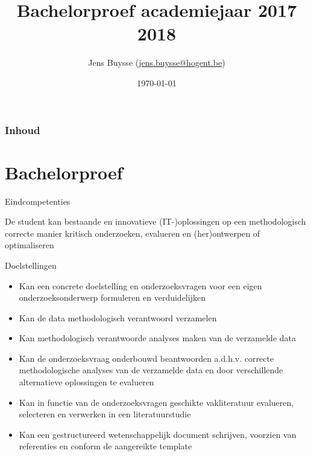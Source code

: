 \documentclass{beamer}
\title[BP 2017 - 2018]{Bachelorproef academiejaar 2017 2018}
\author{Jens {Buysse} \small(\href{mailto:jens.buysse@hogent.be}{jens.buysse@hogent.be})}
\date{\today}
\begin{document}

\HoGentLogo

\begin{frame}[plain]
  \titlepage
\end{frame}

\begin{frame}
  \frametitle{Inhoud}

  \tableofcontents
\end{frame}


\section{Bachelorproef}

\begin{frame}{Eindcompetenties}
\begin{alertblock}{}
	De student kan bestaande en innovatieve \textcolor{HoGentAccent6}{(IT-)oplossingen} op een \textcolor{HoGentAccent6}{methodologisch correcte manier} kritisch \textcolor{HoGentAccent6}{onderzoeken}, \textcolor{HoGentAccent6}{evalueren} en \textcolor{HoGentAccent6}{(her)ontwerpen of optimaliseren}
\end{alertblock}
\end{frame}

\begin{frame}{Doelstellingen}
	\begin{itemize}
		\item Kan een concrete \textcolor{HoGentAccent1}{doelstelling} en \textcolor{HoGentAccent1}{onderzoeksvragen} voor een eigen onderzoeksonderwerp formuleren en verduidelijken 
		\item Kan de data \textcolor{HoGentAccent1}{methodologisch verantwoord} verzamelen 
		\item Kan \textcolor{HoGentAccent1}{methodologisch verantwoorde} analyses maken van de verzamelde data 
		\item Kan de onderzoeksvraag onderbouwd beantwoorden a.d.h.v. correcte \textcolor{HoGentAccent1}{methodologische analyses} van de verzamelde data en door verschillende alternatieve oplossingen te evalueren 
		\item Kan in functie van de onderzoeksvragen geschikte \textcolor{HoGentAccent1}{vakliteratuur} evalueren, selecteren en verwerken in een \textcolor{HoGentAccent1}{literatuurstudie} 
		\item Kan een \textcolor{HoGentAccent1}{gestructureerd wetenschappelijk document} schrijven, voorzien van referenties en conform de aangereikte template
	\end{itemize}
\end{frame}
\end{document}
